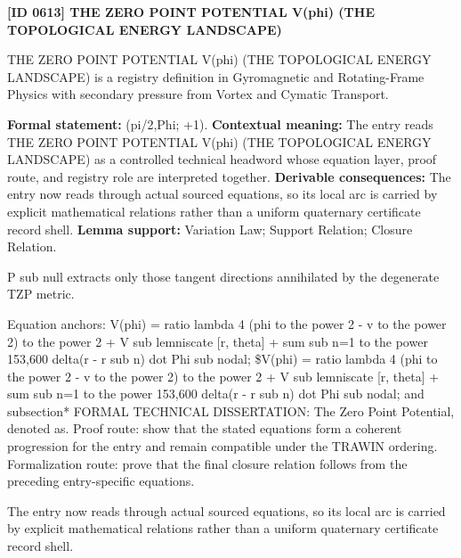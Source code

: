 \clearpage
\noindent\textbf{[ID 0613] THE ZERO POINT POTENTIAL V(phi) (THE TOPOLOGICAL ENERGY LANDSCAPE)}\par
\vspace{0.35em}
\begingroup\small
{}
THE ZERO POINT POTENTIAL V(phi) (THE TOPOLOGICAL ENERGY LANDSCAPE) is a registry definition in Gyromagnetic and Rotating-Frame Physics with secondary pressure from Vortex and Cymatic Transport.

\begingroup\footnotesize\setlength{\emergencystretch}{3em}\sloppy
\textbf{Formal statement:} (pi/2,Phi; +1). \textbf{Contextual meaning:} The entry reads THE ZERO POINT POTENTIAL V(phi) (THE TOPOLOGICAL ENERGY LANDSCAPE) as a controlled technical headword whose equation layer, proof route, and registry role are interpreted together. \textbf{Derivable consequences:} The entry now reads through actual sourced equations, so its local arc is carried by explicit mathematical relations rather than a uniform quaternary certificate record shell. \textbf{Lemma support:} Variation Law; Support Relation; Closure Relation.\par
\endgroup

P sub null extracts only those tangent directions annihilated by the degenerate TZP metric.

Equation anchors: V(phi) = ratio lambda 4 (phi to the power 2 - v to the power 2) to the power 2 + V sub lemniscate [r, theta] + sum sub n=1 to the power 153,600 delta(r - r sub n) dot Phi sub nodal; \$V(phi) = ratio lambda 4 (phi to the power 2 - v to the power 2) to the power 2 + V sub lemniscate [r, theta] + sum sub n=1 to the power 153,600 delta(r - r sub n) dot Phi sub nodal; and subsection* FORMAL TECHNICAL DISSERTATION: The Zero Point Potential, denoted as. Proof route: show that the stated equations form a coherent progression for the entry and remain compatible under the TRAWIN ordering. Formalization route: prove that the final closure relation follows from the preceding entry-specific equations.

The entry now reads through actual sourced equations, so its local arc is carried by explicit mathematical relations rather than a uniform quaternary certificate record shell.
\endgroup

